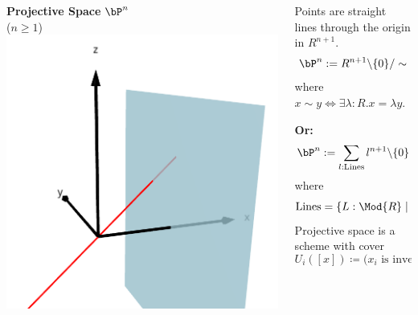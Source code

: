 \documentclass{beamer}
\begin{document}
\begin{frame}
  \begin{columns}
    \begin{column}{0.5\textwidth}
      \textbf{Projective Space} $\bP^n$ \\
      \pause
      ($n\geq 1$)
      \vspace{4mm}
      \pause
      \includegraphics[width=\textwidth]{projective-space.png}
      \vspace{2cm}
    \end{column}
    
    \begin{column}{0.5\textwidth}
      \pause
      Points are straight lines through the origin in $R^{n+1}$.
      \[ \bP^n:= R^{n+1}\text{\textbackslash}\{0\}/\sim \]
      where $x\sim y \Leftrightarrow \exists \lambda :R. x=\lambda y$. 

      \vspace{1em}
      \pause
      \textbf{Or:}
      \[ \bP^n:= \sum_{l:\mathrm{Lines}}l^{n+1}\text{\textbackslash}\{0\} \]
      where
      \[\mathrm{Lines}=\{L:\Mod{R}\mid \|L=R^1\|\}\]
      \pause
      Projective space is a scheme with cover
      \[ U_i([x]) \coloneq \text{($x_i$ is invertible)}. \]      
    \end{column}

  \end{columns}
\end{frame}
\end{document}
